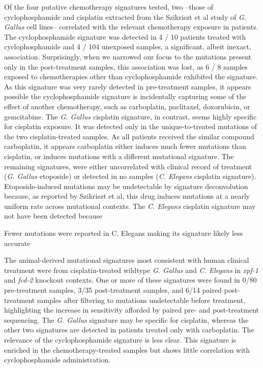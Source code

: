 Of the four putative chemotherapy signatures tested, two --those of cyclophosphamide and cisplatin extracted from the Szikriszt et al study of \textit{G. Gallus} cell lines-- correlated with the relevant chemotherapy exposure in patients. The cyclophosphamide signature was detected in 4 / 10 patients treated with cyclophosphamide and 4 / 104 unexposed samples, a significant, albeit inexact, association. Surprisingly, when we narrowed our focus to the mutations present only in the post-treatment samples, this association was lost, as 6 / 8 samples exposed to chemotherapies other than cyclophosphamide exhibited the signature. As this signature was very rarely detected in pre-treatment samples, it appears possible the cyclophosphamide signature is incidentally capturing some of the effect of another chemotherapy, such as carboplatin, paclitaxel, doxorubicin, or gemcitabine. The \textit{G. Gallus} cisplatin signature, in contrast, seems highly specific for cisplatin exposure. It was detected only in the unique-to-treated mutations of the two cisplatin-treated samples. As all patients received the similar compound carboplatin, it appears carboplatin either induces much fewer mutations than cisplatin, or induces mutations with a different mutational signature. The remaining signatures, were either uncorrelated with clinical record of treatment (\textit{G. Gallus} etoposide) or detected in no samples (\textit{C. Elegans} cisplatin signature). Etoposide-induced mutations may be undetectable by signature deconvolution because, as reported by Szikriszt et al, this drug induces mutations at a nearly uniform rate across mutational contexts. The \textit{C. Elegans} cisplatin signature may not have been detected because 


Fewer mutations were reported in C. Elegans making its signature likely less accurate

The animal-derived mutational signatures most consistent with human clinical treatment were from cisplatin-treated wildtype \textit{G. Gallus} and \textit{C. Elegans} in \textit{xpf-1} and \textit{fcd-2} knockout contexts. One or more of these signatures were found in 0/80 pre-treatment samples, 3/35 post-treatment samples, and 6/14 paired post-treatment samples after filtering to mutations undetectable before treatment, highlighting the increase in sensitivity afforded by paired pre- and post-treatment sequencing. The \textit{G. Gallus} signature may be specific for cisplatin, whereas the other two signatures are detected in patients treated only with carboplatin. The relevance of the cyclophosphamide signature is less clear. This signature is enriched in the chemotherapy-treated samples but shows little correlation with cyclophosphamide administration.


